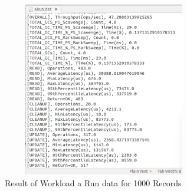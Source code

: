 \documentclass{bigdata}
\begin{document}
\begin{figure}
\includegraphics[height=3in, width=3.5in]{image5}
\caption{Result of Workload a Run data for 1000 Records}
\end{figure}


%

%
%
\end{document}
